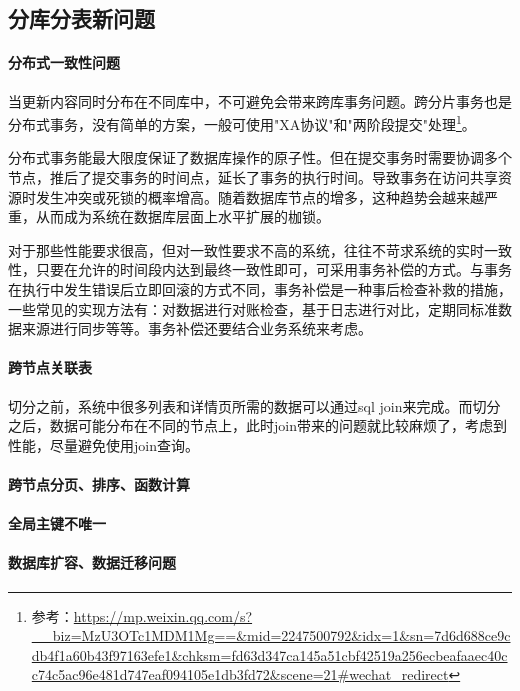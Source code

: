 \documentclass[../../../interview-questions.tex]{subfiles}
\begin{document}
\subsection{分库分表新问题}

\paragraph{分布式一致性问题}

当更新内容同时分布在不同库中，不可避免会带来跨库事务问题。跨分片事务也是分布式事务，没有简单的方案，一般可使用"XA协议"和"两阶段提交"处理\footnote{参考：\url{https://mp.weixin.qq.com/s?__biz=MzU3OTc1MDM1Mg==&mid=2247500792&idx=1&sn=7d6d688ce9cdb4f1a60b43f97163efe1&chksm=fd63d347ca145a51cbf42519a256ecbeafaaec40cc74c5ac96e481d747eaf094105e1db3fd72&scene=21\#wechat_redirect}}。

分布式事务能最大限度保证了数据库操作的原子性。但在提交事务时需要协调多个节点，推后了提交事务的时间点，延长了事务的执行时间。导致事务在访问共享资源时发生冲突或死锁的概率增高。随着数据库节点的增多，这种趋势会越来越严重，从而成为系统在数据库层面上水平扩展的枷锁。


对于那些性能要求很高，但对一致性要求不高的系统，往往不苛求系统的实时一致性，只要在允许的时间段内达到最终一致性即可，可采用事务补偿的方式。与事务在执行中发生错误后立即回滚的方式不同，事务补偿是一种事后检查补救的措施，一些常见的实现方法有：对数据进行对账检查，基于日志进行对比，定期同标准数据来源进行同步等等。事务补偿还要结合业务系统来考虑。

\paragraph{跨节点关联表}

切分之前，系统中很多列表和详情页所需的数据可以通过sql join来完成。而切分之后，数据可能分布在不同的节点上，此时join带来的问题就比较麻烦了，考虑到性能，尽量避免使用join查询。

\paragraph{跨节点分页、排序、函数计算}
\paragraph{全局主键不唯一}
\paragraph{数据库扩容、数据迁移问题}
\end{document}
